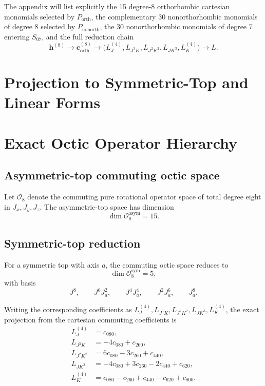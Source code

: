 \documentclass[aip,jcp,reprint,floatfix]{revtex4-2}
\begin{document}
The appendix will list explicitly the 15 degree-8 orthorhombic cartesian
monomials selected by \(P_{\mathrm{orth}}\), the complementary 30
nonorthorhombic monomials of degree 8 selected by \(P_{\mathrm{nonorth}}\), the
30 nonorthorhombic monomials of degree 7 entering \(S_{07}\), and the full
reduction chain
\[
\mathbf h^{(8)}
\longrightarrow
\mathbf c_{\mathrm{orth}}^{(8)}
\longrightarrow
\bigl(L_J^{(4)},L_{J^3K},L_{J^2K^2},L_{JK^3},L_K^{(4)}\bigr)
\longrightarrow
L.
\]

\section{Projection to Symmetric-Top and Linear Forms}

\section{Exact Octic Operator Hierarchy}

\subsection{Asymmetric-top commuting octic space}

Let \(\mathcal O_8\) denote the commuting pure rotational operator space of
total degree eight in \(J_x,J_y,J_z\). The asymmetric-top space has dimension
\begin{equation}
\dim \mathcal O_8^{\mathrm{asym}} = 15.
\end{equation}

\subsection{Symmetric-top reduction}

For a symmetric top with axis \(a\), the commuting octic space reduces to
\begin{equation}
\dim \mathcal O_8^{\mathrm{sym}} = 5,
\end{equation}
with basis
\begin{equation}
J^8,\qquad J^6J_a^2,\qquad J^4J_a^4,\qquad J^2J_a^6,\qquad J_a^8.
\end{equation}

Writing the corresponding coefficients as
\(
L_J^{(4)}, L_{J^3K}, L_{J^2K^2}, L_{JK^3}, L_K^{(4)}
\),
the exact projection from the cartesian commuting coefficients is
\begin{align}
L_J^{(4)} &= c_{080}, \\
L_{J^3K} &= -4c_{080}+c_{260}, \\
L_{J^2K^2} &= 6c_{080}-3c_{260}+c_{440}, \\
L_{JK^3} &= -4c_{080}+3c_{260}-2c_{440}+c_{620}, \\
L_K^{(4)} &= c_{080}-c_{260}+c_{440}-c_{620}+c_{800}.
\end{align}
\end{document}
